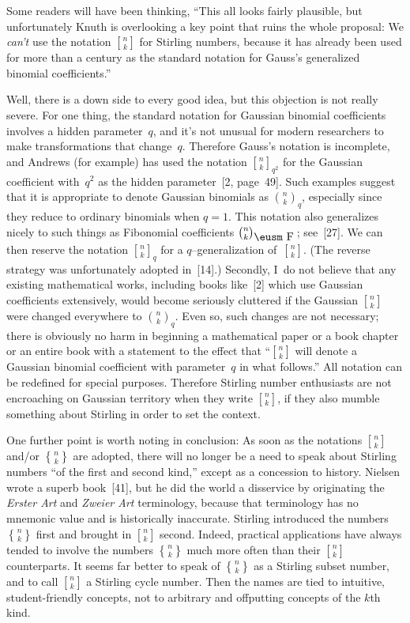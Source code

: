 Some readers will have been thinking, ``This all looks fairly
plausible, but unfortunately Knuth is overlooking a key point that
ruins the whole proposal: We {\it can't\/} use the notation ${n\brack
k}$ for Stirling numbers, because it has already been used for more
than a century as the standard notation for Gauss's generalized
binomial coefficients.''

Well, there is a down side to every good idea, but this objection is
not really severe.
For one thing, the standard notation for Gaussian binomial
coefficients involves a hidden parameter~$q$, and it's not unusual for
modern researchers to make transformations that change~$q$. Therefore
Gauss's notation  is incomplete, and Andrews (for example) has used
the notation ${n\brack k}_{q^2}$ for the Gaussian coefficient 
with~$q^2$ as the hidden parameter~[2, page~49].
Such examples suggest that it is appropriate to denote
 Gaussian binomials as ${n\choose
k}_q$, especially since they reduce to ordinary binomials when $q=1$.
This notation also generalizes nicely to such things as Fibonomial
coefficients ${n\choose k}_{\hbox{\eusm F}}\,$; see~[27]. We can 
then reserve the notation ${n\brack k}_q$ for a
$q$--generalization of~${n\brack k}$. (The reverse strategy was
unfortunately adopted in~[14].) Secondly, I~do not believe that any
existing mathematical works, including  books
like~[2] which use Gaussian coefficients extensively, 
 would become seriously cluttered if the Gaussian ${n\brack
k}$ were changed everywhere to ${n\choose k}_q$. 
Even so, such changes are not necessary;
there is obviously no
harm in beginning a mathematical paper or a book chapter or an entire
book with a statement to the effect that ``${n\brack k}$ will denote a
Gaussian binomial coefficient 
with parameter~$q$ in what follows.'' All notation can be
redefined for special purposes. Therefore Stirling number enthusiasts
are not encroaching on Gaussian territory when they write ${n\brack
k}$, if they also mumble something about Stirling in order to set the
context.

One further point is worth noting in conclusion:
As soon as the notations ${n\brack k}$ and/or ${n\brace k}$ are
adopted, there will no longer be a need to speak about Stirling
numbers ``of the first and second kind,'' except as a concession to
history. Nielsen wrote a superb book~[41], but he did the world a
disservice by originating the {\it Erster Art\/} and {\it Zweier Art\/}
terminology, because that terminology  has no mnemonic value and 
 is historically
inaccurate. Stirling introduced the numbers ${n\brace k}$ first and
brought in ${n \brack k}$ second. Indeed, practical applications have
always tended to involve the numbers ${n\brace k}$ much more often than their
${n\brack k}$ counterparts. It seems far better to speak of ${n\brace
k}$ as a Stirling subset number, and to call ${n\brack k}$ a Stirling
cycle number. Then the names are tied to intuitive, student-friendly
concepts, not to arbitrary and offputting concepts of the $k$th kind.

